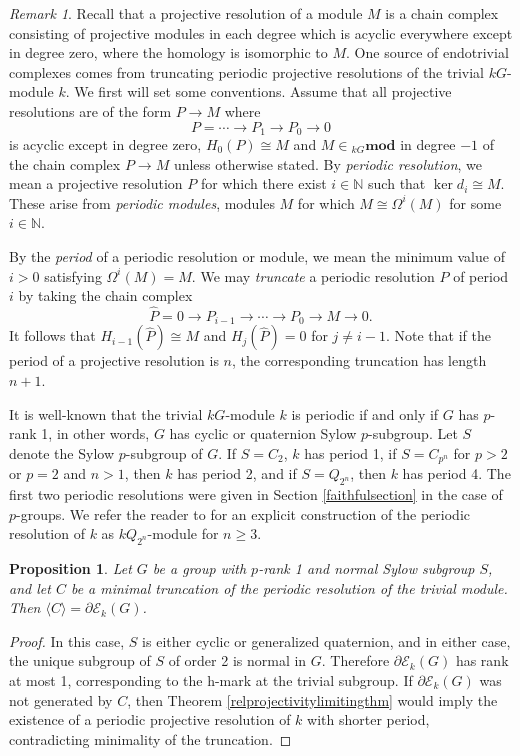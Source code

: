 \documentclass[10pt,letterpaper, boxed, cm]{amsart}
\newcommand{\N}{\mathbb{N}}
\newcommand{\calE}{\mathcal{E}}
\newtheorem{prop}[theorem]{Proposition}
\theoremstyle{remark}
\newtheorem{remark}[theorem]{Remark}
\theoremstyle{definition}
\begin{document}
	\begin{remark}
		Recall that a projective resolution of a module $M$ is a chain complex consisting of projective modules in each degree which is acyclic everywhere except in degree zero, where the homology is isomorphic to $M$. One source of endotrivial complexes comes from truncating periodic projective resolutions of the trivial $kG$-module $k$. We first will set some conventions. Assume that all projective resolutions are of the form $P \to M$ where \[P = \cdots \to P_1 \to P_0 \to 0\] is acyclic except in degree zero, $H_0(P)\cong M$ and $M \in {}_{kG}\mathbf{mod}$ in degree $-1$ of the chain complex $P \to M$ unless otherwise stated. By \textit{periodic resolution}, we mean a projective resolution $P$ for which there exist $i \in \N$ such that $\ker d_{i} \cong M$. These arise from \textit{periodic modules}, modules $M$ for which $M \cong \Omega^i(M)$ for some $i \in \N$.

		By the \textit{period} of a periodic resolution or module, we mean the minimum value of $i > 0$ satisfying $\Omega^i(M) = M$. We may \textit{truncate} a periodic resolution $P$ of period $i$ by taking the chain complex \[\hat{P} = 0 \to P_{i-1}\to \cdots \to P_0 \to M \to 0.\] It follows that $H_{i -1}(\hat{P}) \cong M$ and $H_{j}(\hat{P}) = 0$ for $j \neq i - 1$. Note that if the period of a projective resolution is $n$, the corresponding truncation has length $n+1$.

		It is well-known that the trivial $kG$-module $k$ is periodic if and only if $G$ has $p$-rank 1, in other words, $G$ has cyclic or quaternion Sylow $p$-subgroup. Let $S$ denote the Sylow $p$-subgroup of $G$. If $S = C_2$, $k$ has period 1, if $S = C_{p^n}$ for $p > 2$ or $p = 2$ and $n > 1$, then $k$ has period 2, and if $S = Q_{2^n}$, then $k$ has period 4. The first two periodic resolutions were given in Section \ref{faithfulsection} in the case of $p$-groups. We refer the reader to \cite[Chapter 12.7]{CE56} for an explicit construction of the periodic resolution of $k$ as $kQ_{2^n}$-module for $n \geq 3$.
	\end{remark}

	\begin{prop}\label{prk1gen}
		Let $G$ be a group with $p$-rank 1 and normal Sylow subgroup $S$, and let $C$ be a minimal truncation of the periodic resolution of the trivial module. Then $\langle C\rangle = \partial\calE_k(G)$.
	\end{prop}
	\begin{proof}
		In this case, $S$ is either cyclic or generalized quaternion, and in either case, the unique subgroup of $S$ of order 2 is normal in $G$. Therefore $\partial\calE_k(G)$ has rank at most 1, corresponding to the h-mark at the trivial subgroup. If $\partial\calE_k(G)$ was not generated by $C$, then Theorem \ref{relprojectivitylimitingthm} would imply the existence of a periodic projective resolution of $k$ with shorter period, contradicting minimality of the truncation.
	\end{proof}
\end{document}
